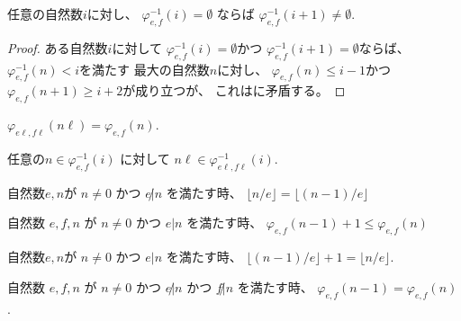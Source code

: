 \begin{lemma}
\label{lm:φinv_i_empty_implies_φinv_i_add_one_nonempty}
任意の自然数$i$に対し、
$\varphi_{e,f}^{-1}(i) = \emptyset$
ならば
$\varphi_{e,f}^{-1}(i+1) \ne \emptyset$.
\end{lemma}

\begin{proof}
ある自然数$i$に対して
$\varphi_{e,f}^{-1}(i) = \emptyset$かつ
$\varphi_{e,f}^{-1}(i+1) = \emptyset$ならば、
$\varphi_{e,f}^{-1}(n) < i$を満たす
最大の自然数$n$に対し、
$\varphi_{e,f}(n) \le i-1$かつ
$\varphi_{e,f}(n+1) \ge i+2$が成り立つが、
これはに矛盾する。
\end{proof}

\begin{lemma}
\label{lm:φ_mul}
\leanok
$\varphi_{e \ell, f \ell}(n \ell) = \varphi_{e,f}(n)$.
\end{lemma}

\begin{lemma}
任意の$n \in \varphi_{e,f}^{-1}(i)$
に対して
$n \ell \in \varphi_{e \ell,f \ell}^{-1}(i)$.
\end{lemma}

\begin{lemma}
\label{lm:not_dvd_mod_eq}
\leanok
自然数$e,n$が
$n \ne 0$
かつ
$e \not | n$
を満たす時、
$\lfloor n / e \rfloor = \lfloor (n-1) / e \rfloor$
\end{lemma}

\begin{lemma}
\label{lm:φ_n_minus_one_eq_φ_n}
\leanok
自然数
$
e,f,n
$
が
$
n \ne 0
$
かつ
$
e | n
$
を満たす時、
$
\varphi_{e,f}(n-1) + 1 \le \varphi_{e,f}(n)
$
\end{lemma}

\begin{lemma}
\label{lm:dvd_mod_ne}
\leanok
自然数$e,n$が
$n \ne 0$
かつ
$e | n$
を満たす時、
$\lfloor (n-1) / e \rfloor + 1 = \lfloor n / e \rfloor$.
\end{lemma}

\begin{lemma}
\label{eq:φ_n_minus_one_eq_φ_n}
自然数
$
e, f, n
$
が
$
n \ne 0
$
かつ
$
e \not | n
$
かつ
$
f \not | n
$
を満たす時、
$
\varphi_{e,f}(n-1) = \varphi_{e,f}(n)
$.
\end{lemma}


